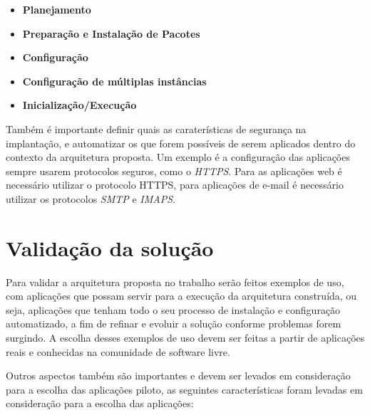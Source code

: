 \begin{itemize}
  \item  \textbf{Planejamento} 
  \item  \textbf{Preparação e Instalação de Pacotes}   
  \item  \textbf{Configuração}   
  \item  \textbf{Configuração de múltiplas instâncias}   
  \item  \textbf{Inicialização/Execução} 
\end{itemize}

Também é importante definir quais as caraterísticas de segurança na implantação, e
automatizar os que forem possíveis de serem aplicados dentro do contexto da
arquitetura proposta. Um exemplo
é a configuração das aplicações sempre usarem protocolos seguros, como o \textit{HTTPS}. 
Para as aplicações web é necessário utilizar o protocolo HTTPS, para aplicações
de e-mail é necessário utilizar os protocolos \textit{SMTP} e \textit{IMAPS}.

\section{Validação da solução}
\label{subsection:validacao}

Para validar a arquitetura proposta no trabalho serão feitos exemplos de uso,
com aplicações que possam servir para a execução da arquitetura construída, ou seja,
aplicações que tenham todo o seu processo de instalação e configuração automatizado, a
fim de refinar e evoluir a solução conforme problemas forem surgindo. A escolha
desses exemplos de uso devem ser feitas a partir de aplicações reais e
conhecidas na comunidade de software livre. 

Outros aspectos também são importantes e devem ser levados em consideração para 
a escolha das aplicações piloto, as seguintes características foram levadas em consideração
para a escolha das aplicações:


